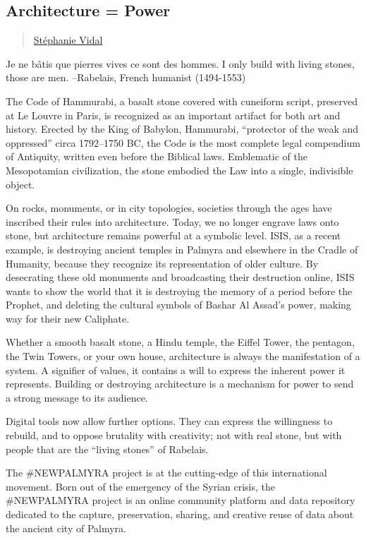 \subsection{Architecture = Power}\label{architecture-power}

\begin{quote}
\hyperlink{stephanie-vidal}{Stéphanie Vidal}
\end{quote}

Je ne bâtis que pierres vives ce sont des hommes. I only build with
living stones, those are men. --Rabelais, French humanist (1494-1553)

The Code of Hammurabi, a basalt stone covered with cuneiform script,
preserved at Le Louvre in Paris, is recognized as an important artifact
for both art and history. Erected by the King of Babylon, Hammurabi,
``protector of the weak and oppressed'' circa 1792--1750 BC, the Code is
the most complete legal compendium of Antiquity, written even before the
Biblical laws. Emblematic of the Mesopotamian civilization, the stone
embodied the Law into a single, indivisible object.

On rocks, monuments, or in city topologies, societies through the ages
have inscribed their rules into architecture. Today, we no longer
engrave laws onto stone, but architecture remains powerful at a symbolic
level. ISIS, as a recent example, is destroying ancient temples in
Palmyra and elsewhere in the Cradle of Humanity, because they recognize
its representation of older culture. By desecrating these old monuments
and broadcasting their destruction online, ISIS wants to show the world
that it is destroying the memory of a period before the Prophet, and
deleting the cultural symbols of Bashar Al Assad's power, making way for
their new Caliphate.

Whether a smooth basalt stone, a Hindu temple, the Eiffel Tower, the
pentagon, the Twin Towers, or your own house, architecture is always the
manifestation of a system. A signifier of values, it contains a will to
express the inherent power it represents. Building or destroying
architecture is a mechanism for power to send a strong message to its
audience.

Digital tools now allow further options. They can express the
willingness to rebuild, and to oppose brutality with creativity; not
with real stone, but with people that are the ``living stones'' of
Rabelais.

The \#NEWPALMYRA project is at the cutting-edge of this international
movement. Born out of the emergency of the Syrian crisis, the
\#NEWPALMYRA project is an online community platform and data repository
dedicated to the capture, preservation, sharing, and creative reuse of
data about the ancient city of Palmyra.

